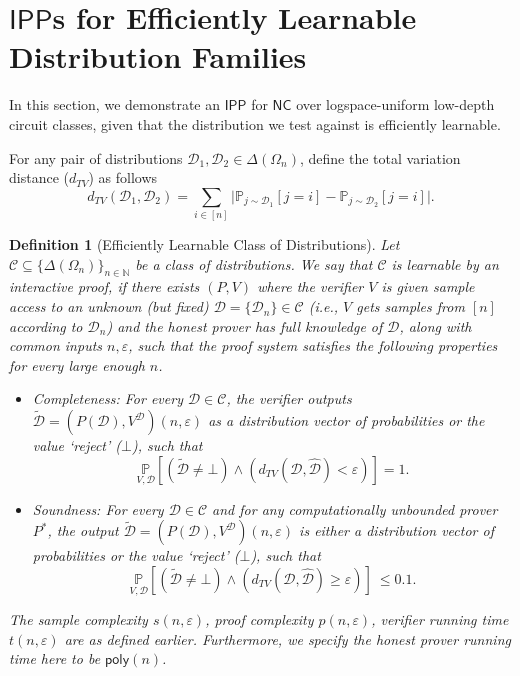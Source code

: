 \documentclass[10pt,a4paper]{article}
\newtheorem{definition}{Definition}[section]
\newcommand{\poly}{\mathsf{poly}}
\newcommand{\NC}{\mathsf{NC}}
\newcommand{\IPP}{\mathsf{IPP}}
\newcommand{\sD}{\mathcal{D}}
\begin{document}
\section{$\IPP$s for Efficiently Learnable Distribution Families}
\label{sec:eff_learn}
In this section, we demonstrate an $\IPP$ for $\NC$ over logspace-uniform low-depth circuit classes, given that the distribution we test against is efficiently learnable. 

For any pair of distributions $\sD_{1},\sD_{2}\in \Delta(\Omega_{n})$, define the total variation distance ($d_{TV}$) as follows 
\begin{equation*}
    d_{TV}(\sD_{1},\sD_{2})=\sum_{i\in [n]}\big\vert\mathbb{P}_{j\sim \sD_{1}}[j=i]-\mathbb{P}_{j\sim \sD_{2}}[j=i]\big\vert.
\end{equation*}

\begin{definition}[Efficiently Learnable Class of Distributions] 
\label{def:eff_learn_dist_ip}
Let $\mathcal{C}\subseteq \{\Delta(\Omega_n)\}_{n \in \mathbb{N}}$ be a class of distributions. We say that $\mathcal{C}$ is learnable by an interactive proof, if there exists $(P,V)$ where the verifier $V$ is given sample access to an unknown (but fixed) $\sD = \{\sD_n\} \in \mathcal{C}$ (i.e., $V$ gets samples from $[n]$ according to $\sD_n$) and the honest prover has full knowledge of $\sD$, along with common inputs $n,\varepsilon$, such that the proof system satisfies the following properties for every large enough $n$.
\begin{itemize}
   \item Completeness: For every $\sD \in \mathcal{C}$, the verifier outputs $\tilde{\sD} = \left( P(\mathcal{D}),V^{\sD} \right)(n,\varepsilon)$ as a distribution vector of probabilities or the value `reject' ($\bot$), such that
    \begin{equation*}
        \underset{V, \sD}{\mathbb{P}}\left[ (\tilde{\sD} \neq \bot) \land (d_{TV}(\mathcal{D},\hat{\mathcal{D}})<\varepsilon) \right] = 1.
    \end{equation*}
    
    \item Soundness: For every $\sD \in \mathcal{C}$ and for any computationally unbounded prover $P^{\ast}$, the output $\tilde{\sD} = \left( P(\mathcal{D}),V^{\sD} \right)(n,\varepsilon)$ is either a distribution vector of probabilities or the value `reject' ($\bot$), such that
    \begin{equation*}
        \underset{V, \sD}{\mathbb{P}} \left[ (\tilde{\sD} \neq \bot) \land (d_{TV}(\mathcal{D},\hat{\mathcal{D}}) \geq \varepsilon) \right]\ \leq 0.1.
    \end{equation*}
\end{itemize}
The sample complexity $s(n,\varepsilon)$, proof complexity $p(n,\varepsilon)$, verifier running time $t(n,\varepsilon)$ are as defined earlier. Furthermore, we specify the honest prover running time here to be $\poly(n)$.
\end{definition}
\end{document}
